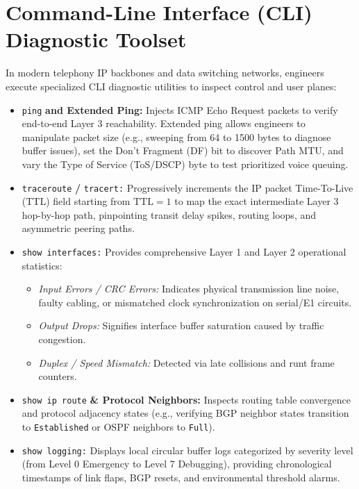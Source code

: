 \documentclass[12pt,a4paper]{report}
\begin{document}
\section{Command-Line Interface (CLI) Diagnostic Toolset}
In modern telephony IP backbones and data switching networks, engineers execute specialized CLI diagnostic utilities to inspect control and user planes:
\begin{itemize}
    \item \texttt{ping} \textbf{and Extended Ping:} Injects ICMP Echo Request packets to verify end-to-end Layer 3 reachability. Extended ping allows engineers to manipulate packet size (e.g., sweeping from 64 to 1500 bytes to diagnose buffer issues), set the Don't Fragment (DF) bit to discover Path MTU, and vary the Type of Service (ToS/DSCP) byte to test prioritized voice queuing.
    
    \item \texttt{traceroute} \textbf{/} \texttt{tracert:} Progressively increments the IP packet Time-To-Live (TTL) field starting from $\text{TTL} = 1$ to map the exact intermediate Layer 3 hop-by-hop path, pinpointing transit delay spikes, routing loops, and asymmetric peering paths.
    
    \item \texttt{show interfaces:} Provides comprehensive Layer 1 and Layer 2 operational statistics:
    \begin{itemize}
        \item \textit{Input Errors / CRC Errors:} Indicates physical transmission line noise, faulty cabling, or mismatched clock synchronization on serial/E1 circuits.
        \item \textit{Output Drops:} Signifies interface buffer saturation caused by traffic congestion.
        \item \textit{Duplex / Speed Mismatch:} Detected via late collisions and runt frame counters.
    \end{itemize}
    
    \item \texttt{show ip route} \textbf{\& Protocol Neighbors:} Inspects routing table convergence and protocol adjacency states (e.g., verifying BGP neighbor states transition to \texttt{Established} or OSPF neighbors to \texttt{Full}).
    
    \item \texttt{show logging:} Displays local circular buffer logs categorized by severity level (from Level 0 Emergency to Level 7 Debugging), providing chronological timestamps of link flaps, BGP resets, and environmental threshold alarms.
\end{itemize}
\end{document}
